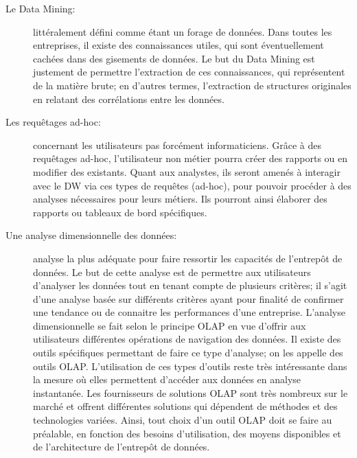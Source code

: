 \documentclass[12pt,a4wide,twoside]{report}
\begin{document}
\begin{description}
\item[Le Data Mining: ]littéralement défini comme étant un forage de données.\newline
Dans toutes les entreprises, il existe des connaissances utiles, qui sont éventuellement cachées dans des gisements de données. Le but du Data Mining est justement de permettre l'extraction de ces connaissances, qui représentent de la matière brute; en d'autres termes, l'extraction de structures originales en relatant des corrélations entre les données.
\item[Les requêtages ad-hoc: ]concernant les utilisateurs pas forcément informaticiens.\newline
Grâce à des requêtages ad-hoc, l'utilisateur non métier pourra créer des rapports ou en modifier des existants. Quant aux analystes, ils seront amenés à interagir avec le DW via ces types de requêtes (ad-hoc), pour pouvoir procéder à des analyses nécessaires pour leurs métiers. Ils pourront ainsi élaborer des rapports ou tableaux de bord spécifiques.

\item[Une analyse dimensionnelle des données: ] analyse la plus adéquate pour faire ressortir les capacités de l'entrepôt de données.\newline
Le but de cette analyse est de permettre aux utilisateurs d'analyser les données tout en tenant compte de plusieurs critères; il s'agit d'une analyse basée sur différents critères ayant pour finalité de confirmer une tendance ou de connaitre les performances d'une entreprise. \newline
L'analyse dimensionnelle se fait selon le principe OLAP en vue d'offrir aux utilisateurs différentes opérations de navigation des données. Il existe des outils spécifiques permettant de faire ce type d'analyse; on les appelle des outils OLAP.\newline
L'utilisation de ces types d'outils reste très intéressante dans la mesure où elles permettent d'accéder aux données en analyse instantanée. Les fournisseurs de solutions OLAP sont très nombreux sur le marché et offrent différentes solutions qui dépendent de méthodes et des technologies variées. Ainsi, tout choix d'un outil OLAP doit se faire au préalable, en fonction des besoins d'utilisation, des moyens disponibles et de l'architecture de l'entrepôt de données.

\end{description}

		
\end{document}
